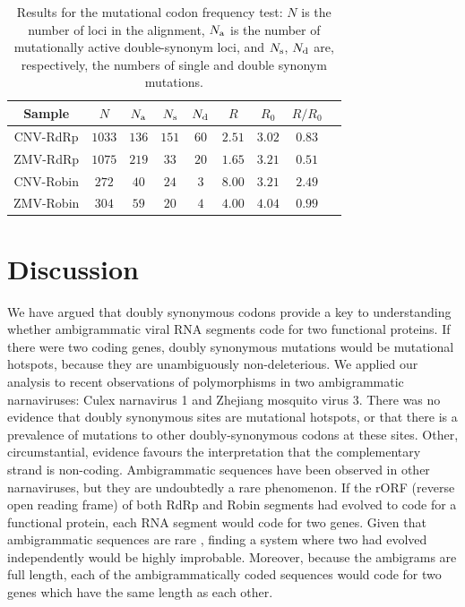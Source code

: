 \documentclass[unnumsec,webpdf,contemporary,large,namedate]{oup-authoring-template}%
\theoremstyle{thmstyleone}%
\theoremstyle{thmstyletwo}%
\theoremstyle{thmstylethree}%
\begin{document}
\begin{table}
\centering
\begin{tabular}{|c|c|c|c|c|c|c|c|c|}
\hline
Sample&$N$&$N_{\rm a}$&$N_{\rm s}$&$N_{\rm d}$&$R$&$R_0$&$R/R_0$\\
\hline
CNV-RdRp  &$1033$&$136$&$151$&$60$&$2.51$&$3.02$&$0.83$\\
ZMV-RdRp  &$1075$&$219$&$33$&$20$&$1.65$&$3.21$&$0.51$\\
CNV-Robin  &$272$&$40$&$24$&$3$&$8.00$&$3.21$&$2.49$\\
ZMV-Robin  &$304$&$59$&$20$&$4$&$4.00$&$4.04$&$0.99$\\

\hline
\end{tabular}
\caption{Results for the mutational codon frequency test: $N$ is the number of loci
in the alignment, $N_{\rm a}$ is the number of mutationally active double-synonym loci, and
$N_{\rm s}$, $N_{\rm d}$ are, respectively, the numbers of single and double synonym mutations.
\label{tab: 5.5}}
\end{table}

\section{Discussion}
\label{sec: 6}

We have argued that doubly synonymous codons provide a key to understanding whether
ambigrammatic viral RNA segments code for two functional proteins. If there were two
coding genes, doubly synonymous mutations would be mutational hotspots,
because they are unambiguously non-deleterious. We applied our analysis to recent
observations of polymorphisms in two ambigrammatic narnaviruses: Culex narnavirus 1
and Zhejiang mosquito virus 3. There was no evidence that doubly synonymous
sites are mutational hotspots, or that there is a prevalence of mutations to other doubly-synonymous codons
at these sites. Other, circumstantial, evidence favours the interpretation that the complementary strand is non-coding.
Ambigrammatic sequences have been observed in other narnaviruses,
but they are undoubtedly a rare phenomenon.
If the rORF (reverse open reading frame) of both RdRp and Robin segments
had evolved to code for a functional protein, each RNA segment would code for two genes.
Given that ambigrammatic sequences are rare \citep{DeR+19}, finding a system where two had evolved
independently would be highly improbable. Moreover, because the ambigrams are full length,
each of the ambigrammatically coded sequences would code for two genes which have the same
length as each other.
\end{document}
